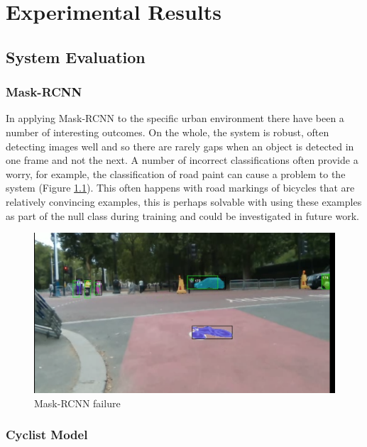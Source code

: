 \documentclass[11pt,twoside]{report}
\begin{document}
\chapter{Experimental Results}

\section{System Evaluation}

\subsection{Mask-RCNN}
In applying Mask-RCNN to the specific urban environment there have been a number of interesting outcomes. On the whole, the system is robust, often detecting images well and so there are rarely gaps when an object is detected in one frame and not the next. A number of incorrect classifications often provide a worry, for example, the classification of road paint can cause a problem to the system (Figure \ref{mrcnn_fail}). This often happens with road markings of bicycles that are relatively convincing examples, this is perhaps solvable with using these examples as part of the null class during training and could be investigated in future work.

\noindent \begin{figure}[h!]
	\includegraphics[width = 1.0\hsize]{figures/segment_bike.png}
	\caption{Mask-RCNN failure}
	\label{mrcnn_fail}
\end{figure}



\subsection{Cyclist Model}
\end{document}
